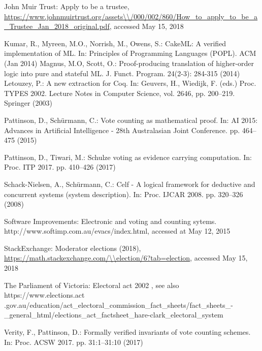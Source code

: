\documentclass{llncs}
\begin{document}
\begin{thebibliography}{10}
{John Muir Trust}: Apply to be a trustee,
  \url{https://www.johnmuirtrust.org/assets\\/000/002/860/How\_to\_apply\_to\_be\_a\_Trustee\_Jan\_2018\_original.pdf},
accessed May 15, 2018

Kumar, R., Myreen, M.O., Norrish, M., Owens, S.: {CakeML}: A verified
  implementation of {ML}. In: Principles of Programming Languages ({POPL}). ACM
  (Jan 2014)
Magnus, M.O, Scott, O.:
Proof-producing translation of higher-order logic into pure and stateful ML. J. Funct. Program. 24(2-3): 284-315 (2014)
Letouzey, P.: A new extraction for {Coq}. In: Geuvers, H., Wiedijk, F. (eds.)
  Proc. TYPES 2002. Lecture Notes in Computer Science, vol. 2646, pp. 200--219.
  Springer (2003)

Pattinson, D., Sch{\"{u}}rmann, C.: Vote counting as mathematical proof. In:
  {AI} 2015: Advances in Artificial Intelligence - 28th Australasian Joint
  Conference. pp. 464--475 (2015)

Pattinson, D., Tiwari, M.: Schulze voting as evidence carrying computation. In:
  Proc. ITP 2017. pp. 410--426 (2017)

Schack{-}Nielsen, A., Sch{\"{u}}rmann, C.: Celf - {A} logical framework for
  deductive and concurrent systems (system description). In: Proc. IJCAR 2008.
  pp. 320--326 (2008)

{Software Improvements}: Electronic and voting and counting sytems. http://www.softimp.com.au/evacs/index.html, accessed at May 12, 2015

StackExchange: Moderator elections (2018),
  \url{https://math.stackexchange.com/\\election/6?tab=election}, accessed May
  15, 2018

{The Parliament of Victoria}: Electoral act 2002 , see also https://www.elections.act\\.gov.au/education/act\_electoral\_commission\_fact\_sheets/fact\_sheets\_-\_general\_html/elections\_act\_factsheet\_hare-clark\_electoral\_system

Verity, F., Pattinson, D.: Formally verified invariants of vote counting
  schemes. In: Proc. ACSW 2017. pp. 31:1--31:10 (2017)

\end{thebibliography}
\end{document}
